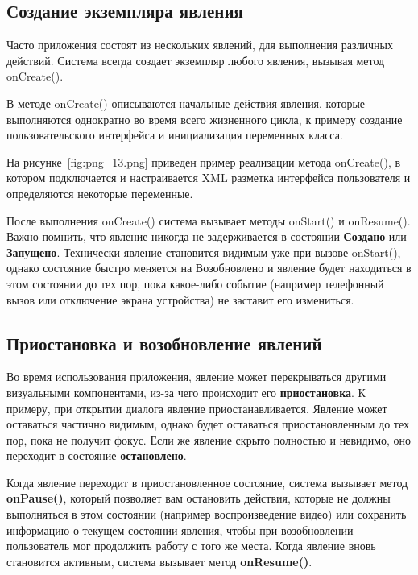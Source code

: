 \subsection{Создание экземпляра явления}
Часто приложения состоят из нескольких явлений, для выполнения
различных действий. Система всегда создает экземпляр любого явления,
вызывая метод onCreate().\par
В методе onCreate() описываются начальные действия явления, которые
выполняются однократно во время всего жизненного цикла, к примеру
создание пользовательского интерфейса и инициализация переменных
класса.\par
На рисунке~\ref{fig:png_13.png} приведен пример
реализации метода onCreate(), в котором подключается и настраивается XML
разметка интерфейса пользователя и определяются некоторые переменные.

После выполнения onCreate() система вызывает методы onStart() и
onResume(). Важно помнить, что явление никогда не задерживается в состоянии
\textbf{Создано} или \textbf{Запущено}. Технически явление становится
видимым уже при вызове onStart(), однако состояние быстро меняется на
Возобновлено и явление будет находиться в этом состоянии до тех пор,
пока какое-либо событие (например телефонный вызов или отключение экрана
устройства) не заставит его измениться.

\subsection{Приостановка и возобновление явлений}
Во время использования приложения, явление может перекрываться другими
визуальными компонентами, из-за чего происходит его \textbf{приостановка}. К
примеру, при открытии диалога явление приостанавливается. Явление может
оставаться частично видимым, однако будет оставаться приостановленным
до тех пор, пока не получит фокус. Если же явление скрыто полностью
и невидимо, оно переходит в состояние \textbf{остановлено}.\par
Когда явление переходит в приостановленное состояние, система вызывает
метод \textbf{onPause()}, который позволяет вам остановить действия, которые
не должны выполняться в этом состоянии (например воспроизведение видео)
или сохранить информацию о текущем состоянии явления, чтобы при
возобновлении пользователь мог продолжить работу с того же места. Когда
явление вновь становится активным, система вызывает метод \textbf{onResume()}.

